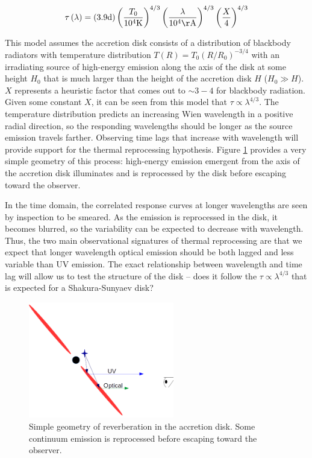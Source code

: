 \documentclass[11pt,letterpaper]{article}
\begin{document}
    \begin{equation}
        \label{eq:timelag}
        \tau\left(\lambda\right) = 
            \left(3.9 \textrm{d}\right) 
            \left(\frac{T_0}{10^4\mathrm{K}}\right)^{4/3}
            \left(\frac{\lambda}{10^4\mathrm{\AA}}\right)^{4/3}
            \left(\frac{X}{4}\right)^{4/3}
    \end{equation}

    This model assumes the accretion disk consists of a distribution of blackbody radiators with temperature distribution $T\left(R\right) = T_0\left(R/R_0\right)^{-3/4}$ with an irradiating source of high-energy emission along the axis of the disk at some height $H_0$ that is much larger than the height of the accretion disk $H$ ($H_0 \gg H$). $X$ represents a heuristic factor that comes out to $\sim3-4$ for blackbody radiation. Given some constant $X$, it can be seen from this model that $\tau \propto \lambda^{4/3}$. The temperature distribution predicts an increasing Wien wavelength in a positive radial direction, so the responding wavelengths should be longer as the source emission travels farther. Observing time lags that increase with wavelength will provide support for the thermal reprocessing hypothesis. Figure \ref{fig:disk_reverb} provides a very simple geometry of this process: high-energy emission emergent from the axis of the accretion disk illuminates and is reprocessed by the disk before escaping toward the observer.

    In the time domain, the correlated response curves at longer wavelengths are seen by inspection to be smeared. As the emission is reprocessed in the disk, it becomes blurred, so the variability can be expected to decrease with wavelength. Thus, the two main observational signatures of thermal reprocessing are that we expect that longer wavelength optical emission should be both lagged and less variable than UV emission. The exact relationship between wavelength and time lag will allow us to test the structure of the disk -- does it follow the $\tau \propto \lambda^{4/3}$ that is expected for a Shakura-Sunyaev disk?

    \begin{figure}
        \centering
        \includegraphics[width=2.5in]{../img/basic_geometry.png}
        \caption{Simple geometry of reverberation in the accretion disk. Some continuum emission is reprocessed before escaping toward the observer.}
        \label{fig:disk_reverb}
    \end{figure}
\end{document}
